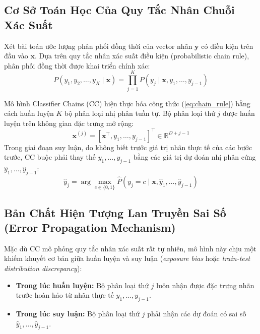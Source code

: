 \documentclass[1p,times]{elsarticle}
\begin{document}
\subsection{Cơ Sở Toán Học Của Quy Tắc Nhân Chuỗi Xác Suất}
Xét bài toán ước lượng phân phối đồng thời của vector nhãn $\mathbf{y}$ có điều kiện trên đầu vào $\mathbf{x}$. Dựa trên quy tắc nhân xác suất điều kiện (probabilistic chain rule), phân phối đồng thời được khai triển chính xác:
\begin{equation}
    P(y_1, y_2, \dots, y_K \mid \mathbf{x}) = \prod_{j=1}^K P(y_j \mid \mathbf{x}, y_1, \dots, y_{j-1})
    \label{eq:chain_rule}
\end{equation}

Mô hình Classifier Chains (CC) \citep{read2011classifier} hiện thực hóa công thức (\ref{eq:chain_rule}) bằng cách huấn luyện $K$ bộ phân loại nhị phân tuần tự. Bộ phân loại thứ $j$ được huấn luyện trên không gian đặc trưng mở rộng:
\begin{equation}
    \mathbf{x}^{(j)} = [\mathbf{x}^\top, y_1, \dots, y_{j-1}]^\top \in \mathbb{R}^{D + j - 1}
\end{equation}
Trong giai đoạn suy luận, do không biết trước giá trị nhãn thực tế của các bước trước, CC buộc phải thay thế $y_1, \dots, y_{j-1}$ bằng các giá trị dự đoán nhị phân cứng $\hat{y}_1, \dots, \hat{y}_{j-1}$:
\begin{equation}
    \hat{y}_j = \arg\max_{c \in \{0, 1\}} \hat{P}(y_j = c \mid \mathbf{x}, \hat{y}_1, \dots, \hat{y}_{j-1})
\end{equation}

\subsection{Bản Chất Hiện Tượng Lan Truyền Sai Số (Error Propagation Mechanism)}
Mặc dù CC mô phỏng quy tắc nhân xác suất rất tự nhiên, mô hình này chịu một khiếm khuyết cơ bản giữa huấn luyện và suy luận (\textit{exposure bias} hoặc \textit{train-test distribution discrepancy}):
\begin{itemize}
    \item \textbf{Trong lúc huấn luyện:} Bộ phân loại thứ $j$ luôn nhận được đặc trưng nhãn trước hoàn hảo từ nhãn thực tế $y_1, \dots, y_{j-1}$.
    \item \textbf{Trong lúc suy luận:} Bộ phân loại thứ $j$ phải nhận các dự đoán có sai số $\hat{y}_1, \dots, \hat{y}_{j-1}$.
\end{itemize}
\end{document}
